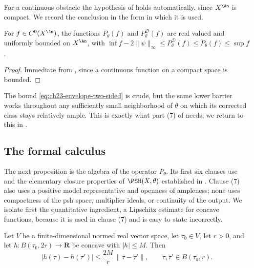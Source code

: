 For a continuous obstacle the hypothesis of
 holds automatically, since $X^{\An}$ is
compact.  We record the conclusion in the form in which it is used.

\begin{corollary}\label{cor:ch23-continuous-finite}
For $f\in C^0(X^{\An})$, the functions $P_\theta(f)$ and
$P^{\mathcal D}_\theta(f)$ are real valued and uniformly bounded on
$X^{\An}$, with
$\inf f-2\|\psi\|_\infty\le P^{\mathcal D}_\theta(f)\le P_\theta(f)\le\sup f$.
\end{corollary}

\begin{proof}
Immediate from , since a continuous
function on a compact space is bounded.
\end{proof}

The bound \eqref{eq:ch23-envelope-two-sided} is crude, but the same lower
barrier works throughout any sufficiently small neighborhood of $\theta$ on
which its corrected class stays relatively ample.  This is exactly what part (7) of
 needs; we return to this in
.

\subsection{The formal calculus}
\label{sec:ch23-formal-calculus}

The next proposition is the algebra of the operator $P_\theta$.  Its first
six clauses use
 and the elementary closure properties of
$\PSH(X,\theta)$ established in .
Clause (7) also uses a positive model representative and openness of
ampleness; none uses compactness of the psh space, multiplier ideals, or
continuity of the output.  We isolate first the quantitative ingredient, a Lipschitz
estimate for concave functions, because it is used in clause (7) and is easy
to state incorrectly.

\begin{lemma}
\label{lem:ch23-concave-lipschitz}
Let $V$ be a finite-dimensional normed real vector space, let
$\tau_0\in V$, let $r>0$, and let
$h:B(\tau_0,2r)\to\mathbf R$ be concave with $|h|\leq M$.  Then
\begin{equation}\label{eq:ch23-concave-lipschitz}
 |h(\tau)-h(\tau')|\leq\frac{2M}{r}\,\|\tau-\tau'\|,
 \qquad \tau,\tau'\in B(\tau_0,r).
\end{equation}
\end{lemma}


